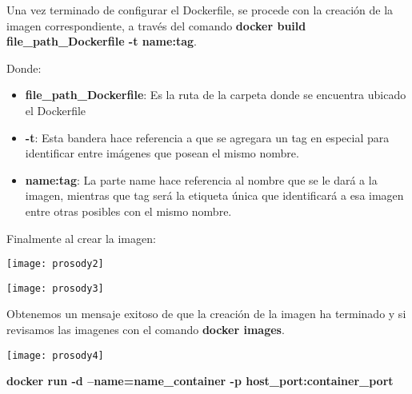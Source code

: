 \documentclass[10pt,letterpaper]{article}
\begin{document}
Una vez terminado de configurar el Dockerfile, se procede con la creación de la imagen correspondiente, a través del comando \textbf{docker build file\_path\_Dockerfile -t name:tag}.

Donde:

\begin{itemize}
\item \textbf{file\_path\_Dockerfile}: Es la ruta de la carpeta donde se encuentra ubicado el Dockerfile
\item \textbf{-t}: Esta bandera hace referencia a que se agregara un tag en especial para identificar entre imágenes que posean el mismo nombre.
\item \textbf{name:tag}: La parte name hace referencia al nombre que se le dará a la imagen, mientras que tag será la etiqueta única que identificará a esa imagen entre otras posibles con el mismo nombre.
\end{itemize}

Finalmente al crear la imagen:

\begin{center}
\texttt{[image: prosody2]}
\end{center}

\begin{center}
\texttt{[image: prosody3]}
\end{center}

Obtenemos un mensaje exitoso de que la creación de la imagen ha terminado y si revisamos las imagenes con el comando \textbf{docker images}.

\begin{center}
\texttt{[image: prosody4]}
\end{center}


\textbf{docker run -d --name=name\_container -p host\_port:container\_port }
\end{document}
